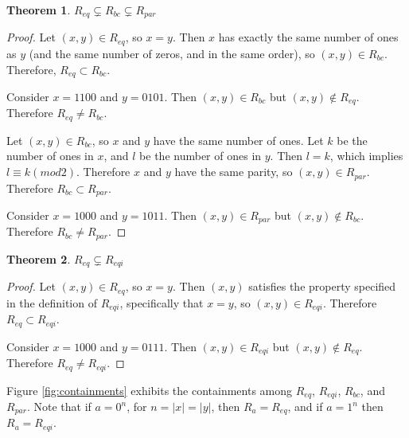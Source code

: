 \documentclass{article}
\newtheorem{theorem}{Theorem}[section]
\newtheorem{lemma}{Lemma}[section]
\theoremstyle{definition}
\newcommand{\sigmastar}{\Sigma^{*}}
\begin{document}
\begin{theorem}$R_{eq} \subsetneq R_{bc} \subsetneq R_{par}$\end{theorem}
\begin{proof}
  Let $(x,y)\in R_{eq}$, so $x=y$. Then $x$ has exactly the same number of ones
  as $y$ (and the same number of zeros, and in the same order), so $(x,y) \in
  R_{bc}$. Therefore, $R_{eq} \subset R_{bc}$.
 
  Consider $x=1100$ and $y=0101$. Then $(x,y)\in R_{bc}$ but $(x,y) \notin
  R_{eq}$. Therefore $R_{eq} \neq R_{bc}$.

  Let $(x,y)\in R_{bc}$, so $x$ and $y$ have the same number of ones. Let $k$
  be the number of ones in $x$, and $l$ be the number of ones in $y$. Then
  $l=k$, which implies $l \equiv k (mod 2)$. Therefore $x$ and $y$ have the
  same parity, so $(x,y)\in R_{par}$. Therefore $R_{bc} \subset R_{par}$.

  Consider $x=1000$ and $y=1011$. Then $(x,y)\in R_{par}$ but $(x,y) \notin
  R_{bc}$. Therefore $R_{bc} \neq R_{par}$.
\end{proof}

\begin{theorem}$R_{eq} \subsetneq R_{eqi}$\end{theorem}
\begin{proof}
  Let $(x,y)\in R_{eq}$, so $x=y$. Then $(x,y)$ satisfies the property
  specified in the definition of $R_{eqi}$, specifically that $x=y$, so
  $(x,y) \in R_{eqi}$. Therefore $R_{eq} \subset R_{eqi}$.

  Consider $x=1000$ and $y=0111$. Then $(x,y)\in R_{eqi}$ but $(x,y) \notin
  R_{eq}$. Therefore $R_{eq} \neq R_{eqi}$.
\end{proof}

Figure \ref{fig:containments} exhibits the containments among $R_{eq}$,
$R_{eqi}$, $R_{bc}$, and $R_{par}$. Note that if $a=0^n$, for $n=|x|=|y|$, then
$R_{a}=R_{eq}$, and if $a=1^n$ then $R_{a}=R_{eqi}$.

\end{document}
